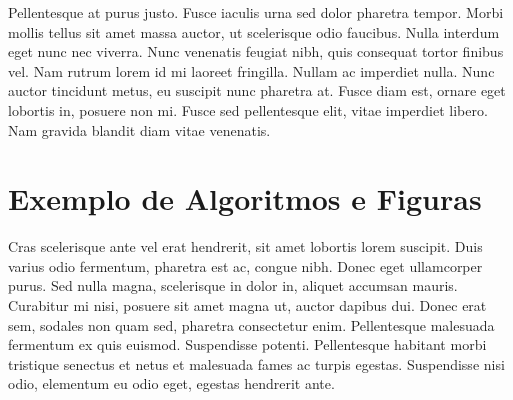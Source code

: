 \cite{Huetal2000} 

Pellentesque at purus justo. Fusce iaculis urna sed dolor pharetra tempor. Morbi mollis tellus sit amet massa auctor, ut scelerisque odio faucibus. Nulla interdum eget nunc nec viverra. Nunc venenatis feugiat nibh, quis consequat tortor finibus vel. Nam rutrum lorem id mi laoreet fringilla. Nullam ac imperdiet nulla. Nunc auctor tincidunt metus, eu suscipit nunc pharetra at. Fusce diam est, ornare eget lobortis in, posuere non mi. Fusce sed pellentesque elit, vitae imperdiet libero. Nam gravida blandit diam vitae venenatis.

\section{Exemplo de Algoritmos e Figuras}
\label{sec:exemplo-de-algoritmos-e-figuras}

Cras scelerisque ante vel erat hendrerit, sit amet lobortis lorem suscipit. Duis varius odio fermentum, pharetra est ac, congue nibh. Donec eget ullamcorper purus. Sed nulla magna, scelerisque in dolor in, aliquet accumsan mauris. Curabitur mi nisi, posuere sit amet magna ut, auctor dapibus dui. Donec erat sem, sodales non quam sed, pharetra consectetur enim. Pellentesque malesuada fermentum ex quis euismod. Suspendisse potenti. Pellentesque habitant morbi tristique senectus et netus et malesuada fames ac turpis egestas. Suspendisse nisi odio, elementum eu odio eget, egestas hendrerit ante.

\begin{algorithm}[ht!]
	\SetSpacedAlgorithm
	\caption{\label{exemplo-de-algoritmo}Como escrever algoritmos no \LaTeX2e}
\end{algorithm}

